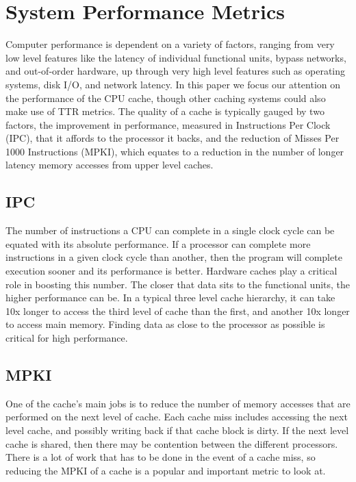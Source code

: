 \section{System Performance Metrics}

Computer performance is dependent on a variety of factors,
 ranging from very low level features like the latency of individual functional units,
 bypass networks, and out-of-order hardware, up through very high level features such as operating systems,
 disk I/O, and network latency. 
In this paper we focus our attention on the performance of the CPU cache, though other caching systems could also make use of TTR metrics.
The quality of a cache is typically gauged by two factors,
 the improvement in performance, measured in Instructions Per Clock (IPC),
 that it affords to the processor it backs, and the reduction of Misses Per 1000 Instructions (MPKI),
 which equates to a reduction in the number of longer latency memory accesses from upper level caches.

\subsection{IPC}

The number of instructions a CPU can complete in a single clock cycle can be equated with its absolute performance.
If a processor can complete more instructions in a given clock cycle than another, then the program will complete execution sooner and its performance is better.
Hardware caches play a critical role in boosting this number.
The closer that data sits to the functional units, the higher performance can be.
In a typical three level cache hierarchy, it can take 10x longer to access the third level of cache than the first,
 and another 10x longer to access main memory.
Finding data as close to the processor as possible is critical for high performance.

\subsection{MPKI}

One of the cache's main jobs is to reduce the number of memory accesses that are performed on the next level of cache.
Each cache miss includes accessing the next level cache, and possibly writing back if that cache block is dirty.
If the next level cache is shared, then there may be contention between the different processors.
There is a lot of work that has to be done in the event of a cache miss,
 so reducing the MPKI of a cache is a popular and important metric to look at.

